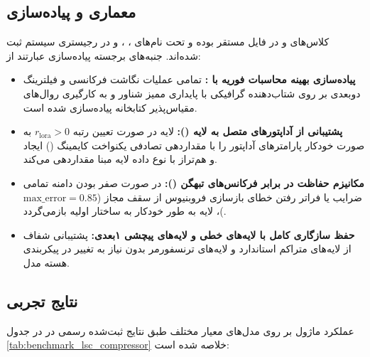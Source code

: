 \subsection{معماری و پیاده‌سازی}
کلاس‌های  و  در فایل  مستقر بوده و تحت نام‌های ، ،  و  در رجیستری سیستم ثبت شده‌اند. جنبه‌های برجسته پیاده‌سازی عبارتند از:
\begin{itemize}
    \item \textbf{پیاده‌سازی بهینه محاسبات فوریه با :} تمامی عملیات نگاشت فرکانسی و فیلترینگ دو‌بعدی بر روی شتاب‌دهنده گرافیکی با پایداری ممیز شناور  و به کارگیری روال‌های مقیاس‌پذیر کتابخانه  پیاده‌سازی شده است.
    \item \textbf{پشتیبانی از آداپتورهای  متصل به لایه ():} لایه  در صورت تعیین رتبه $r_{\text{lora}} > 0$ به صورت خودکار پارامترهای آداپتور را با مقداردهی تصادفی یکنواخت کایمینگ () ایجاد و هم‌تراز با نوع داده لایه مبنا مقداردهی می‌کند.
    \item \textbf{مکانیزم حفاظت در برابر فرکانس‌های تبهگن ():} در صورت صفر بودن دامنه تمامی ضرایب یا فراتر رفتن خطای بازسازی فروبنیوس از سقف مجاز ($\text{max\_error}=0.85$)، لایه به طور خودکار به ساختار اولیه بازمی‌گردد.
    \item \textbf{حفظ سازگاری کامل با لایه‌های خطی و لایه‌های پیچشی ۱بعدی:} پشتیبانی شفاف از لایه‌های متراکم استاندارد و لایه‌های  ترنسفورمر بدون نیاز به تغییر در پیکربندی هسته مدل.
\end{itemize}

\subsection{نتایج تجربی}
عملکرد ماژول  بر روی مدل‌های معیار مختلف طبق نتایج ثبت‌شده رسمی در  در جدول \ref{tab:benchmark_lsc_compressor} خلاصه شده است:

